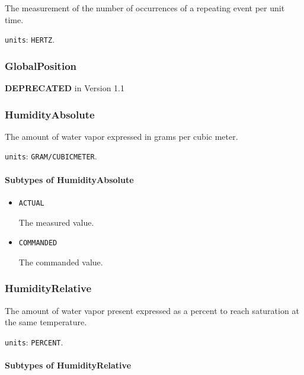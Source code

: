 The measurement of the number of occurrences of a repeating event per unit time.


\texttt{units}: \texttt{HERTZ}.


\subsubsection{GlobalPosition}
\label{sec:GlobalPosition}



\textbf{DEPRECATED} in Version 1.1



\subsubsection{HumidityAbsolute}
\label{sec:HumidityAbsolute}



The amount of water vapor expressed in grams per cubic meter.


\texttt{units}: \texttt{GRAM/CUBIC\textunderscore METER}.

\paragraph{Subtypes of HumidityAbsolute}\mbox{}
\label{sec:Subtypes of HumidityAbsolute}

\begin{itemize}

\item \texttt{ACTUAL}


The measured value.

\item \texttt{COMMANDED}


The commanded value.


\end{itemize}





\subsubsection{HumidityRelative}
\label{sec:HumidityRelative}



The amount of water vapor present expressed as a percent to reach saturation at the same temperature.


\texttt{units}: \texttt{PERCENT}.

\paragraph{Subtypes of HumidityRelative}\mbox{}
\label{sec:Subtypes of HumidityRelative}


